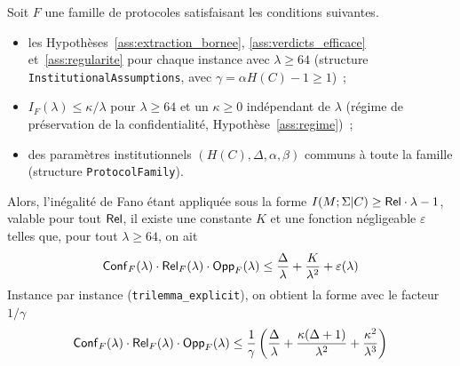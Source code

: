 \begin{sloppypar}
\begin{theorem}
\label{thm:conditional_CRO_trilemma}
Soit $F$ une famille de protocoles satisfaisant les conditions suivantes.
\begin{itemize}
    \item les Hypoth\`eses~\ref{ass:extraction_bornee}, \ref{ass:verdicts_efficace}
          et~\ref{ass:regularite} pour chaque instance avec $\lambda \geq 64$ (structure
          \texttt{InstitutionalAssumptions}, avec $\gamma = \alpha H(C) - 1 \geq 1$)~;
    \item $I_F(\lambda) \leq \kappa/\lambda$ pour $\lambda \geq 64$ et un $\kappa \geq 0$
          ind\'ependant de $\lambda$ (r\'egime de pr\'eservation de la
          confidentialit\'e, Hypoth\`ese~\ref{ass:regime})~;
    \item des param\`etres institutionnels $(H(C),\Delta,\alpha,\beta)$ communs \`a
          toute la famille (structure \texttt{ProtocolFamily}).
\end{itemize}
Alors, l'in\'egalit\'e de Fano \'etant appliqu\'ee sous la forme
$I(M;\Sigma|C) \geq \mathsf{Rel}\cdot\lambda - 1$, valable pour tout $\mathsf{Rel}$, il existe une
constante $K$ et une fonction n\'egligeable $\varepsilon$ telles que, pour tout
$\lambda \geq 64$, on ait
\begin{equation}
\mathsf{Conf}_F(\lambda) \cdot \mathsf{Rel}_F(\lambda) \cdot \mathsf{Opp}_F(\lambda) \leq \frac{\Delta}{\lambda} + \frac{K}{\lambda^2} + \varepsilon(\lambda)
\label{eq:main_theorem_lean4}
\end{equation}
Instance par instance (\texttt{trilemma\_explicit}), on obtient la forme avec le facteur $1/\gamma$
\begin{equation}
\mathsf{Conf}_F(\lambda) \cdot \mathsf{Rel}_F(\lambda) \cdot \mathsf{Opp}_F(\lambda) \leq \frac{1}{\gamma}\left(\frac{\Delta}{\lambda} + \frac{\kappa(\Delta+1)}{\lambda^2} + \frac{\kappa^2}{\lambda^3}\right)
\label{eq:main_theorem_lean4_explicit}
\end{equation}
\end{theorem}


\end{sloppypar}
